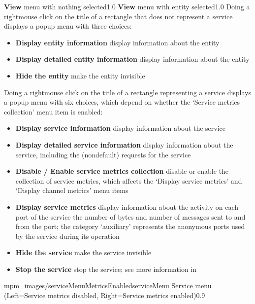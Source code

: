 %
{\textbf{View} menu with nothing selected}{1.0}
\condPage
{}%
{\textbf{View} menu with entity selected}{1.0}
Doing a right\longDash{}mouse click on the title of a rectangle that does not represent a
service displays a popup menu with three choices:
\begin{itemize}
\item\textbf{Display entity information} display information about the entity
\item\exSp\textbf{Display detailed entity information} display information about the
entity
\item\exSp\textbf{Hide the entity} make the entity invisible
\end{itemize}
\condPage{}
Doing a right\longDash{}mouse click on the title of a rectangle representing a service
displays a popup menu with six choices, which depend on whether the `Service metrics
collection' menu item is enabled:
\begin{itemize}
\item\textbf{Display service information} display information about the service
\item\exSp\textbf{Display detailed service information} display information about the
service, including the (non\longDash{}default) requests for the service
\item\exSp\textbf{Disable / Enable service metrics collection} disable or enable the
collection of service metrics, which affects the `Display service metrics' and `Display
channel metrics' menu items
\item\exSp\textbf{Display service metrics} display information about the activity on each
port of the service \longDash{} the number of bytes and number of messages sent to and
from the port; the category `auxiliary' represents the anonymous ports used by the service
during its operation
\item\exSp\textbf{Hide the service} make the service invisible
\item\exSp\textbf{Stop the service} stop the service; see more information in
\end{itemize}
%
{mpm_images/serviceMenuMetricsEnabled}{serviceMenu}%
{Service menu (Left=Service metrics disabled, Right=Service metrics enabled)}{0.9}
